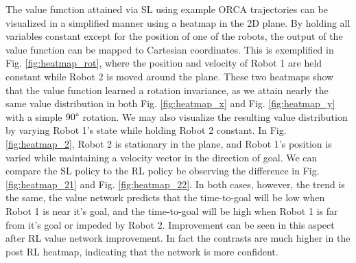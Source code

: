 \documentclass[conference]{IEEEtran}
\begin{document}
The value function attained via SL using example ORCA trajectories can be visualized in a simplified manner using a heatmap in the 2D plane. By holding all variables constant except for the position of one of the robots, the output of the value function can be mapped to Cartesian coordinates. This is exemplified in Fig. \ref{fig:heatmap_rot}, where the position and velocity of Robot 1 are held constant while Robot 2 is moved around the plane. These two heatmaps show that the value function learned a rotation invariance, as we attain nearly the same value distribution in both Fig. \ref{fig:heatmap_x} and  Fig. \ref{fig:heatmap_y} with a simple $90\degree$ rotation. We may also visualize the resulting value distribution by varying Robot 1's state while holding Robot 2 constant. In Fig. \ref{fig:heatmap_2}, Robot 2 is stationary in the plane, and Robot 1's position is varied while maintaining a velocity vector in the direction of goal. We can compare the SL policy to the RL policy be observing the difference in Fig. \ref{fig:heatmap_21} and Fig. \ref{fig:heatmap_22}. In both cases, however, the trend is the same, the value network predicts that the time-to-goal will be low when Robot 1 is near it's goal, and the time-to-goal will be high when Robot 1 is far from it's goal or impeded by Robot 2. Improvement can be seen in this aspect after RL value network improvement.
In fact the contrasts are much higher in the post RL heatmap, indicating that the network is more confident. 
\end{document}
